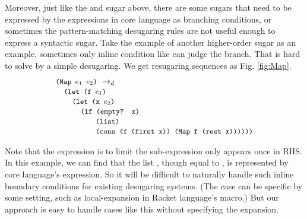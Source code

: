 Moreover, just like the  and  sugar above, there are some sugars that need to be expressed by the expressions in core language as branching conditions, or sometimes the pattern-matching desugaring rules are not useful enough to express a syntactic sugar. Take the example of another higher-order sugar  as an example, sometimes only inline condition like  can judge the branch. That is hard to solve by a simple desugaring. We get resugaring sequences as Fig.  \ref{fig:Map}.
\[
\begin{array}{l}
\texttt{\small(Map $e_1$ $e_2$)} ~\rightarrow_d~\\
\quad\texttt{\small (let (f $e_1$)}\\
\qquad\texttt{\small(let (x $e_2$)}\\
\qquad\quad

\texttt{\small(if (empty? x)}\\
\qquad\qquad\;\;\;\texttt{\small(list)}\\
\qquad\qquad\;\;\;\texttt{\small(cons (f (first x)) (Map f (rest x))))))}


\end{array}
\]



Note that the  expression is to limit the sub-expression only appears once in RHS. In this example, we can find that the list , though equal to , is represented by core language's expression. So it will be difficult to naturally handle such inline boundary conditions for existing desugaring systems. (The case can be specific by some setting, such as local-expansion\cite{10.1017/S0956796812000093} in Racket language's macro.) But our approach is easy to handle cases like this without specifying the expansion.


